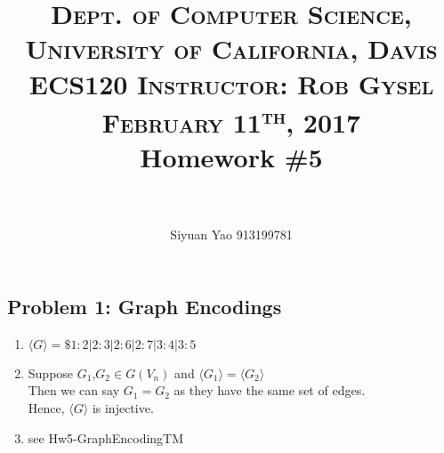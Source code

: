 \documentclass[paper=a4, fontsize=11pt]{scrartcl} %
\title{	
\normalfont \normalsize 
\textsc{Dept. of Computer Science, University of California, Davis\\ECS120 \hspace{.5in} Instructor: Rob Gysel \hspace{.5in} February 11\textsuperscript{th}, 2017} %
\horrule{0.5pt} \\[0.4cm] %
\huge Homework \#5 \\ %
\horrule{2pt} \\[0.5cm] %
}
\author{Siyuan Yao	913199781} %
\date{}
\numberwithin{equation}{section} %
\numberwithin{figure}{section} %
\numberwithin{table}{section} %
\theoremstyle{definition}
\begin{document}
\maketitle %

\subsection*{Problem 1: Graph Encodings}
\begin{enumerate}[label=(\alph*)]
	\item $\langle G\rangle =\$1:2|2:3|2:6|2:7|3:4|3:5$
	\item Suppose $G_1$,$G_2\in G(V_n)$ and $\langle G_1 \rangle = \langle G_2 \rangle$ \\
	Then we can say $G_1=G_2$ as they have the same set of edges.\\
	Hence, $\langle G\rangle$ is injective.


	\item see Hw5-GraphEncodingTM

\end{enumerate}
\end{document}
